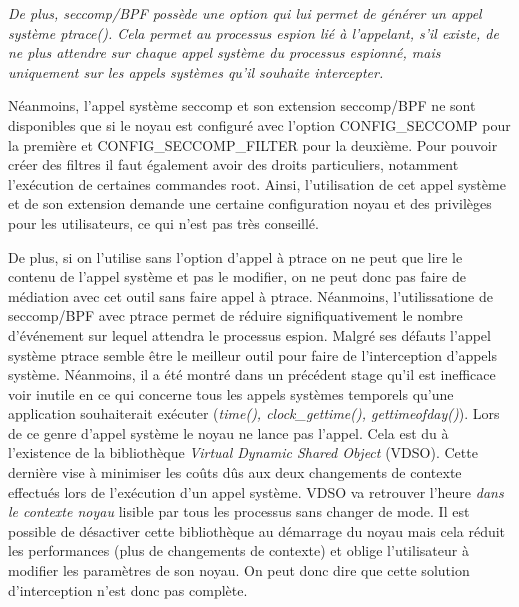 \textit{ De plus, seccomp/BPF possède une option qui lui permet de générer un
  appel système ptrace(). Cela permet au processus espion lié à l'appelant, s'il
  existe, de ne plus attendre sur chaque appel système du processus espionné,
  mais uniquement sur les appels systèmes qu'il souhaite intercepter.}

Néanmoins, l'appel système seccomp et son extension seccomp/BPF ne sont
disponibles que si le noyau est configuré avec l'option CONFIG\_SECCOMP pour la
première et CONFIG\_SECCOMP\_FILTER pour la deuxième. Pour pouvoir créer des
filtres il faut également avoir des droits particuliers, notamment l'exécution de
certaines commandes root. Ainsi, l'utilisation de cet appel système et de son
extension demande une certaine configuration noyau et des privilèges pour les
utilisateurs, ce qui n'est pas très conseillé.

De plus, si on l'utilise sans l'option d'appel à ptrace on ne peut que lire le
contenu de l'appel système et pas le modifier, on ne peut donc pas faire de
médiation avec cet outil sans faire appel à ptrace. Néanmoins,
  l'utilissatione de seccomp/BPF avec ptrace permet de réduire
  signifiquativement le nombre d'événement sur lequel attendra le processus
  espion.
\newline
Malgré ses défauts l'appel système ptrace semble être le meilleur outil pour
faire de l'interception d'appels système. Néanmoins, il a été montré dans un
précédent stage \citet{MARION:Interception} qu'il est inefficace voir inutile en
ce qui concerne tous les appels systèmes temporels qu'une application
souhaiterait exécuter (\textit{time(), clock\_gettime(), gettimeofday()}). Lors
de ce genre d'appel système le noyau ne lance pas l'appel. Cela est du à
l'existence de la bibliothèque \textit{Virtual Dynamic Shared Object}
(VDSO). Cette dernière vise à minimiser les coûts dûs aux deux changements de
contexte effectués lors de l'exécution d'un appel système. VDSO va retrouver
l'heure \textit{{\color{red}dans le contexte noyau}} lisible par tous les
processus sans changer de mode. Il est possible de désactiver cette bibliothèque
au démarrage du noyau mais cela réduit les performances (plus de changements de
contexte) et oblige l'utilisateur à modifier les paramètres de son noyau. On
peut donc dire que cette solution d'interception n'est donc pas complète.


